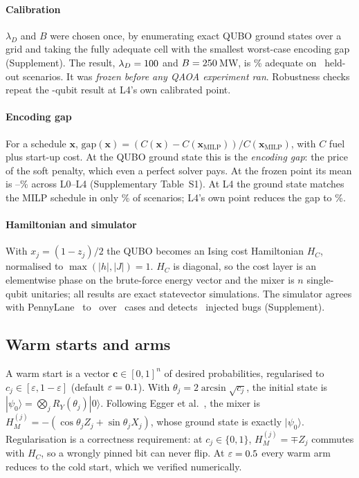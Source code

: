 \label{sec:calibration}
\paragraph{Calibration} $\lambda_D$ and $B$ were chosen once, by enumerating exact QUBO ground states over a grid and taking the fully adequate cell with the smallest worst-case encoding gap (Supplement). The result, $\lambda_D=100$ and $B=250$\,MW, is \CalTestAdeq\% adequate on \CalTest\ held-out scenarios. It was \emph{frozen before any QAOA experiment ran}. Robustness checks repeat the \NLfour-qubit result at L4's own calibrated point.

\label{sec:gap}
\paragraph{Encoding gap} For a schedule $\mathbf x$, $\mathrm{gap}(\mathbf x)=(C(\mathbf x)-C(\mathbf x_{\mathrm{MILP}}))/C(\mathbf x_{\mathrm{MILP}})$, with $C$ fuel plus start-up cost. At the QUBO ground state this is the \emph{encoding gap}: the price of the soft penalty, which even a perfect solver pays. At the frozen point its mean is \GapFrozenMin--\GapFrozenMax\% across L0--L4 (Supplementary Table~S1). At L4 the ground state matches the MILP schedule in only \MatchLfour\% of scenarios; L4's own point reduces the gap to \GapOwnLfour\%.

\label{sec:ising}\label{sec:sim}
\paragraph{Hamiltonian and simulator} With $x_j=(1-z_j)/2$ the QUBO becomes an Ising cost Hamiltonian $H_C$, normalised to $\max(|h|,|J|)=1$. $H_C$ is diagonal, so the cost layer is an elementwise phase on the brute-force energy vector and the mixer is $n$ single-qubit unitaries; all results are exact statevector simulations. The simulator agrees with PennyLane~\cite{bergholm2018pennylane} to \ValWorst\ over \ValCases\ cases and detects \ValBugN\ injected bugs (Supplement).

\subsection{Warm starts and arms}
\label{sec:warm}

A warm start is a vector $\mathbf c\in[0,1]^n$ of desired probabilities, regularised to $c_j\in[\varepsilon,1-\varepsilon]$ (default $\varepsilon=0.1$). With $\theta_j=2\arcsin\sqrt{c_j}$, the initial state is $|\psi_0\rangle=\bigotimes_jR_Y(\theta_j)|0\rangle$. Following Egger et al.~\cite{egger2021warm}, the mixer is $H_M^{(j)}=-(\cos\theta_jZ_j+\sin\theta_jX_j)$, whose ground state is exactly $|\psi_0\rangle$. Regularisation is a correctness requirement: at $c_j\in\{0,1\}$, $H_M^{(j)}=\mp Z_j$ commutes with $H_C$, so a wrongly pinned bit can never flip. At $\varepsilon=0.5$ every warm arm reduces to the cold start, which we verified numerically.

